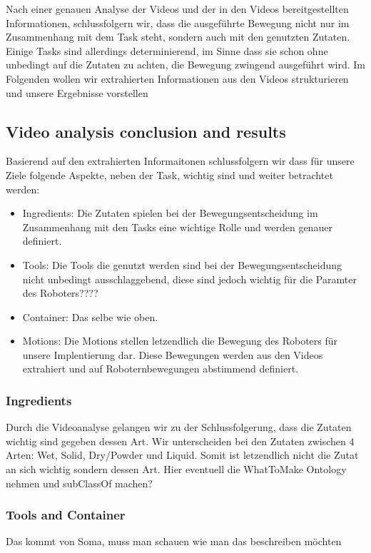 Nach einer genauen Analyse der Videos und der in den Videos bereitgestellten Informationen, schlussfolgern wir, dass die ausgeführte Bewegung nicht nur im Zusammenhang mit dem Task steht, sondern auch mit den genutzten Zutaten. Einige Tasks sind allerdings determinierend, im Sinne dass sie schon ohne unbedingt auf die Zutaten zu achten, die Bewegung zwingend ausgeführt wird.
Im Folgenden wollen wir extrahierten Informationen aus den Videos strukturieren und unsere Ergebnisse vorstellen
\subsection*{Video analysis conclusion and results}

Basierend auf den extrahierten Informaitonen schlussfolgern wir dass für unsere Ziele folgende Aspekte, neben der Task, wichtig sind und weiter betrachtet werden:
\begin{itemize}
  \item Ingredients: Die Zutaten spielen bei der Bewegungsentscheidung im Zusammenhang mit den Tasks eine wichtige Rolle und werden genauer definiert.
  \item Tools: Die Tools die genutzt werden sind bei der Bewegungsentscheidung nicht unbedingt ausschlaggebend, diese sind jedoch wichtig für die Paramter des Roboters????
  \item Container: Das selbe wie oben.
  \item Motions: Die Motions stellen letzendlich die Bewegung des Roboters für unsere Implentierung dar. Diese Bewegungen werden aus den Videos extrahiert und auf Roboternbewegungen abstimmend definiert.
\end{itemize}

\subsubsection*{Ingredients}
Durch die Videoanalyse gelangen wir zu der Schlussfolgerung, dass die Zutaten wichtig sind gegeben dessen Art. Wir unterscheiden bei den Zutaten zwischen 4 Arten:
Wet, Solid, Dry/Powder und Liquid. Somit ist letzendlich nicht die Zutat an sich wichtig sondern dessen Art.
Hier eventuell die WhatToMake Ontology nehmen und subClassOf machen?

\subsubsection*{Tools and Container}
Das kommt von Soma, muss man schauen wie man das beschreiben möchten

